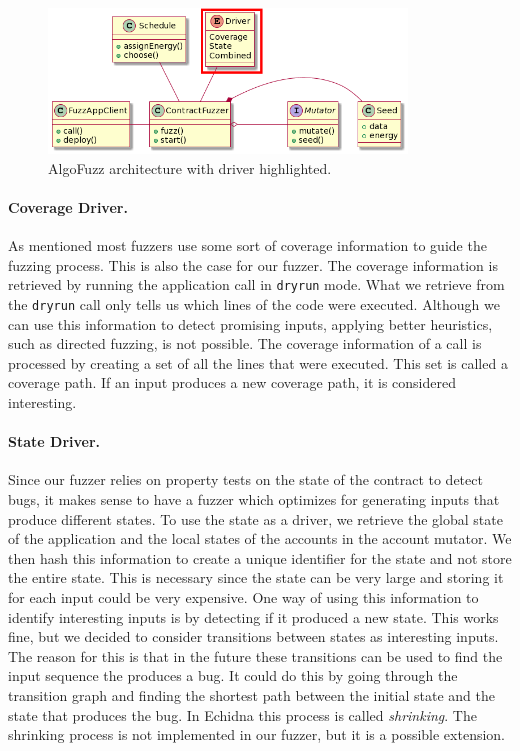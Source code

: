 \begin{figure}[htbp]
    \centering
    \includegraphics[width=0.85\textwidth]{figures/arc-driver.png}
    \caption{AlgoFuzz architecture with driver highlighted.}\label{fig:architecture-driver}
\end{figure}

\paragraph{Coverage Driver.}
As mentioned most fuzzers use some sort of coverage information to guide the fuzzing process.
This is also the case for our fuzzer.
The coverage information is retrieved by running the application call in \texttt{dryrun} mode.
What we retrieve from the \texttt{dryrun} call only tells us which lines of the code were executed.
Although we can use this information to detect promising inputs, applying better heuristics, such as directed fuzzing, is not possible.
The coverage information of a call is processed by creating a set of all the lines that were executed.
This set is called a coverage path.
If an input produces a new coverage path, it is considered interesting.

\paragraph{State Driver.}
Since our fuzzer relies on property tests on the state of the contract to detect bugs, it makes sense to have a fuzzer which optimizes for generating inputs that produce different states.
To use the state as a driver, we retrieve the global state of the application and the local states of the accounts in the account mutator.
We then hash this information to create a unique identifier for the state and not store the entire state.
This is necessary since the state can be very large and storing it for each input could be very expensive.
One way of using this information to identify interesting inputs is by detecting if it produced a new state.
This works fine, but we decided to consider transitions between states as interesting inputs.
The reason for this is that in the future these transitions can be used to find the input sequence the produces a bug.
It could do this by going through the transition graph and finding the shortest path between the initial state and the state that produces the bug.
In Echidna this process is called \textit{shrinking}.
The shrinking process is not implemented in our fuzzer, but it is a possible extension.

